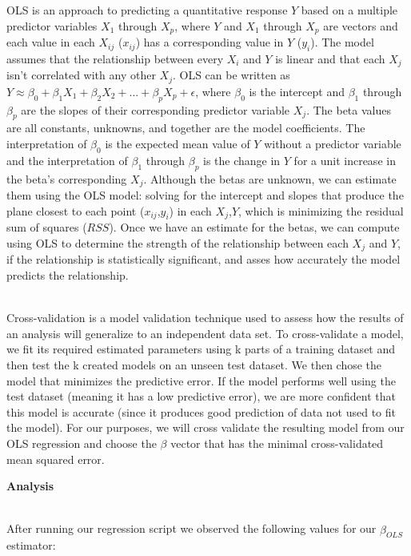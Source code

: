 \documentclass[11pt,english]{article}
\begin{document}
OLS is an approach to predicting a quantitative response $Y$ based on a multiple predictor variables $X_1$ through $X_p$, where $Y$ and $X_1$ through $X_p$ are vectors and each value in each $X_{ij}$ ($x_{ij}$) has a corresponding value in $Y$ ($y_i$). The model assumes that the relationship between every $X_i$ and $Y$ is linear and that each $X_j$ isn't correlated with any other $X_j$. OLS can be written as $Y \approx \beta_0 + \beta_1X_1 + \beta_2X_2 + ... + \beta_pX_p + \epsilon$, where $\beta_0$ is the intercept and $\beta_1$ through $\beta_p$ are the slopes of their corresponding predictor variable $X_j$. The beta values are all constants, unknowns, and together are the model coefficients. The interpretation of $\beta_0$ is the expected mean value of $Y$ without a predictor variable and the interpretation of $\beta_1$ through $\beta_p$ is the change in $Y$ for a unit increase in the beta's corresponding $X_j$. Although the betas are unknown, we can estimate them using the OLS model: solving for the intercept and slopes that produce the plane closest to each point ($x_{ij}$,$y_i$) in each $X_j$,$Y$, which is minimizing the residual sum of squares ($RSS$). Once we have an estimate for the betas, we can compute using OLS to determine the strength of the relationship between each $X_j$ and $Y$, if the relationship is statistically significant, and asses how accurately the model predicts the relationship. \\\

Cross-validation is a model validation technique used to assess how the results of an analysis will generalize to an independent data set. To cross-validate a model, we fit its required estimated parameters using k parts of a training dataset and then test the k created models on an unseen test dataset. We then chose the model that minimizes the predictive error. If the model performs well using the test dataset (meaning it has a low predictive error), we are more confident that this model is accurate (since it produces good prediction of data not used to fit the model). For our purposes, we will cross validate the resulting model from our OLS regression and choose the $\beta$ vector that has the minimal cross-validated mean squared error.
\newpage


{\large\textbf{Analysis}} \\\

After running our regression script we observed the following values for our $\hat{\beta}_{OLS}$ estimator:
\end{document}
